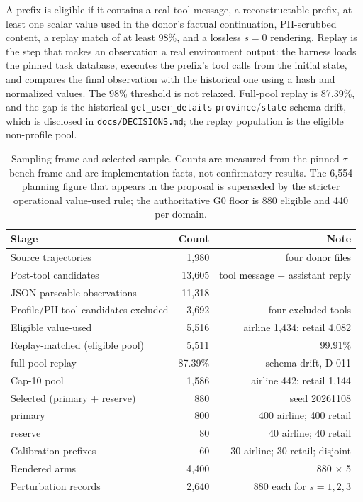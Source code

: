\documentclass[a4paper,fleqn]{cas-sc}
\begin{document}
A prefix is eligible if it contains a real tool message, a reconstructable prefix, at least one
scalar value used in the donor's factual continuation, PII-scrubbed content, a replay match of at
least 98\%, and a lossless $s=0$ rendering. Replay is the step that makes an observation a real
environment output: the harness loads the pinned task database, executes the prefix's tool calls
from the initial state, and compares the final observation with the historical one using a hash
and normalized values. The 98\% threshold is not relaxed. Full-pool replay is 87.39\%, and the
gap is the historical \texttt{get\_user\_details} \texttt{province}/\texttt{state} schema drift,
which is disclosed in \texttt{docs/DECISIONS.md}; the replay population is the eligible
non-profile pool.

\begin{table}[pos=htbp]
  \centering
  \caption{Sampling frame and selected sample. Counts are measured from the pinned $\tau$-bench
  frame and are implementation facts, not confirmatory results. The 6{,}554 planning figure that
  appears in the proposal is superseded by the stricter operational value-used rule; the
  authoritative G0 floor is 880 eligible and 440 per domain.}
  \label{tab:supply}
  \small
  \begin{tabular}{>{\raggedright\arraybackslash}p{6.6cm}rr}
    \toprule
    \textbf{Stage} & \textbf{Count} & \textbf{Note} \\
    \midrule
    Source trajectories                 & 1{,}980 & four donor files \\
    Post-tool candidates                & 13{,}605 & tool message + assistant reply \\
    JSON-parseable observations         & 11{,}318 & \\
    Profile/PII-tool candidates excluded & 3{,}692 & four excluded tools \\
    Eligible value-used                 & 5{,}516 & airline 1{,}434; retail 4{,}082 \\
    Replay-matched (eligible pool)      & 5{,}511 & 99.91\% \\
    \quad full-pool replay              & 87.39\% & schema drift, D-011 \\
    Cap-10 pool                         & 1{,}586 & airline 442; retail 1{,}144 \\
    Selected (primary + reserve)        & 880 & seed 20261108 \\
    \quad primary                       & 800 & 400 airline; 400 retail \\
    \quad reserve                       & 80 & 40 airline; 40 retail \\
    Calibration prefixes                & 60 & 30 airline; 30 retail; disjoint \\
    Rendered arms                       & 4{,}400 & 880 $\times$ 5 \\
    Perturbation records                & 2{,}640 & 880 each for $s=1,2,3$ \\
    \bottomrule
  \end{tabular}
\end{table}
\end{document}
